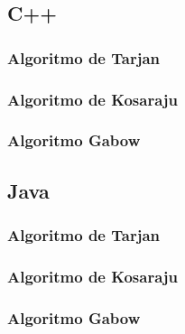 \subsection{C++}

\subsubsection{Algoritmo de Tarjan}


\subsubsection{Algoritmo de Kosaraju}


\subsubsection{Algoritmo Gabow}


\subsection{Java}


\subsubsection{Algoritmo de Tarjan}


\subsubsection{Algoritmo de Kosaraju}


\subsubsection{Algoritmo Gabow}
